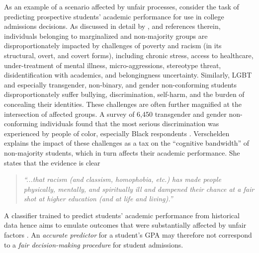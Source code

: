 \documentclass[11pt,dvipdfm]{article}
\begin{document}
As an example of a scenario affected by unfair processes, consider the task of predicting prospective students' academic performance for use in college admissions decisions.  As discussed in detail by \cite{verschelden2017bandwidth}, and references therein, individuals belonging to marginalized and non-majority groups are disproportionately impacted by challenges of poverty and racism (in its structural, overt, and covert forms), including chronic stress, access to healthcare, under-treatment of mental illness, micro-aggressions, stereotype threat, disidentification with academics, and belongingness uncertainty.  Similarly, LGBT and especially transgender, non-binary, and gender non-conforming students disproportionately suffer bullying, discrimination, self-harm, and the burden of concealing their identities.
These challenges are often further magnified at the intersection of affected groups.  A survey of 6,450 transgender and gender non-conforming individuals found that the most serious discrimination was experienced by people of color, especially Black respondents \cite{grant2011injustice}.
Verschelden explains the impact of these challenges as a tax on the ``cognitive bandwidth'' of non-majority students, which in turn affects their academic performance.  She states that the evidence is clear %
\begin{quote}
	\emph{%
	``...that racism (and classism, homophobia, etc.) has made people physically, mentally, and spiritually ill and dampened their chance at a fair shot at higher education (and at life and living).''} \cite{verschelden2017bandwidth}
\end{quote}
A classifier trained to predict students' academic performance from historical data hence aims to emulate outcomes that were substantially affected by unfair factors \cite{barocas2016big}.
An \emph{accurate predictor} for a student's GPA may therefore not correspond to a \emph{fair decision-making procedure} for student admissions.
\end{document}

